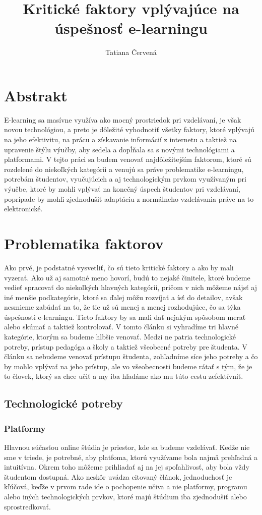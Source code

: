 \documentclass[12pt]{article}
\title{Kritické faktory vplývajúce na úspešnosť e-learningu}
\author{Tatiana Červená}
\begin{document}
\maketitle
\section*{Abstrakt}
E-learning sa masívne využíva ako mocný prostriedok pri vzdelávaní, je však novou technológiou, a preto je dôležité vyhodnotiť všetky faktory, ktoré vplývajú na jeho efektivitu, na prácu a získavanie informácií z internetu a taktiež na upravenie štýlu výučby, aby sedela a dopĺňala sa s novými technológiami a platformami. V tejto práci sa budem venovať najdôležitejším faktorom, ktoré sú rozdelené do niekoľkých kategórii a venujú sa práve problematike e-learningu, potrebám študentov, vyučujúcich a aj technologickým prvkom využívaným pri výučbe, ktoré by mohli vplývať na konečný úspech študentov pri vzdelávaní, poprípade by mohli zjednodušiť adaptáciu z normálneho vzdelávania práve na to elektronické.
\section{Problematika faktorov}
Ako prvé, je podstatné vysvetliť, čo sú tieto kritické faktory a ako by mali vyzerať. Ako už aj samotné meno hovorí, budú to nejaké činitele, ktoré budeme vedieť spracovať do niekoľkých hlavných kategórii, pričom v nich môžeme nájsť aj iné menšie podkategórie, ktoré sa ďalej môžu rozvíjať a ísť do detailov, avšak nesmieme zabúdať na to, že tie už sú menej a menej rozhodujúce, čo sa týka úspešnosti e-learningu. Tieto faktory by sa mali dať nejakým spôsobom merať alebo skúmať a taktiež kontrolovať. V tomto článku si vyhradíme tri hlavné kategórie, ktorým sa budeme hlbšie venovať. Medzi ne patria technologické potreby, prístup pedagóga a školy a taktiež všeobecné potreby pre študenta. V článku sa nebudeme venovať prístupu študenta, zohľadníme síce jeho potreby a čo by mohlo vplývať na jeho prístup, ale vo všeobecnosti budeme rátať s tým, že je to človek, ktorý sa chce učiť a my iba hľadáme ako mu túto cestu zefektívniť.   
\subsection{Technologické potreby}
\subsubsection{Platformy}
Hlavnou súčasťou online štúdia je priestor, kde sa budeme vzdelávať. Kedže nie sme v triede, je potrebné, aby platfoma, ktorú využívame bola najmä prehľadná a intuitívna. Okrem toho môžeme prihliadať aj na jej spoľahlivosť, aby bola vždy študentom dostupná. Ako neskôr uvádza citovaný článok, jednoduchosť je kľúčová, keďže v prvom rade ide o pochopenie učiva a nie platformy, programu alebo iných technologických prvkov, ktoré majú štúdium iba zjednodušiť alebo sprostredkovať.   \cite{CSF1}
\end{document}
